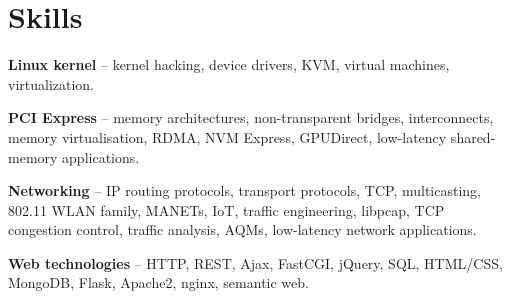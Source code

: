 
\section{Skills}
\begin{small}
	\parbox[t][][t]{\linewidth}{
		\textbf{Linux kernel} -- kernel hacking, device drivers,
		KVM, virtual machines, virtualization.
		\smallbreak
	}
	\parbox[t][][t]{\linewidth}{
		\textbf{PCI Express} -- memory architectures, non-transparent bridges, 
		interconnects, memory virtualisation, RDMA, NVM Express, GPUDirect,
		low-latency shared-memory applications.
		\smallbreak
	}
	\parbox[t][][t]{\linewidth}{
		\textbf{Networking} -- IP routing protocols, transport protocols, TCP,
		multicasting, 802.11 WLAN family, MANETs, IoT,  
		traffic engineering, libpcap, TCP congestion control, traffic
		analysis, AQMs, low-latency network applications.
		\smallbreak
	}
	\parbox[t][][t]{\linewidth}{
		\textbf{Web technologies} -- HTTP, REST, Ajax, FastCGI, jQuery, 
		SQL, HTML/CSS, MongoDB, Flask, Apache2, nginx, semantic web.
		\smallbreak
	}
\end{small}
